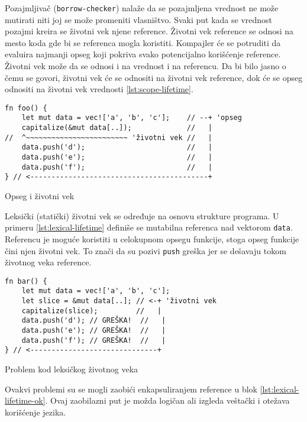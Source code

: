 Pozajmljivač (\verb|borrow-checker|) nalaže da se pozajmljena vrednost ne može mutirati niti joj se može promeniti vlasništvo. Svaki put kada se vrednost pozajmi kreira se životni vek njene reference. 
Životni vek reference se odnosi na mesto koda gde bi se referenca mogla koristiti. Kompajler će se potruditi da evaluira najmanji opseg koji pokriva svako potencijalno korišćenje reference.
Životni vek može da se odnosi i na vrednost i na referencu. Da bi bilo jasno o čemu se govori, životni vek će se odnositi na životni vek reference, dok će se opseg odnositi na životni vek vrednosti \ref{lst:scope-lifetime}.

\begin{listing}[H]
\begin{verbatim}
fn foo() {
    let mut data = vec!['a', 'b', 'c'];    // --+ 'opseg
    capitalize(&mut data[..]);             //   |
//  ^~~~~~~~~~~~~~~~~~~~~~~~~ 'životni vek //   |
    data.push('d');                        //   |
    data.push('e');                        //   |
    data.push('f');                        //   |
} // <------------------------------------------+
\end{verbatim}
\caption{Opseg i životni vek}
\label{lst:scope-lifetime}
\end{listing}

\break

Leksički (statički) životni vek se određuje na osnovu strukture programa. U primeru \ref{lst:lexical-lifetime} definiše se mutabilna referenca nad vektorom \verb|data|.
Referencu je moguće koristiti u celokupnom opsegu funkcije, stoga opseg funkcije čini njen životni vek. To znači da su pozivi \verb|push| greška jer se dešavaju tokom životnog veka
reference.

\begin{listing}[H]
\begin{verbatim}
fn bar() {
    let mut data = vec!['a', 'b', 'c'];
    let slice = &mut data[..]; // <-+ 'životni vek
    capitalize(slice);         //   |
    data.push('d'); // GREŠKA!  //   |
    data.push('e'); // GREŠKA!  //   |
    data.push('f'); // GREŠKA!  //   |
} // <------------------------------+
\end{verbatim}
\caption{Problem kod leksičkog životnog veka}
\label{lst:lexical-lifetime}
\end{listing}

Ovakvi problemi su se mogli zaobići enkapsuliranjem reference u blok \ref{lst:lexical-lifetime-ok}. Ovaj zaobilazni put je možda logičan ali izgleda veštački i otežava korišćenje jezika. 

